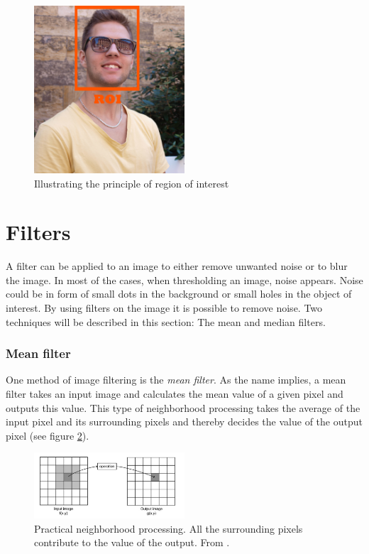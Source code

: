 \begin{figure}[htbp] 
\centering 
\includegraphics[width=0.5\textwidth]{Pictures/Theory/RegionOfInterest.jpg} 
\caption{Illustrating the principle of region of interest} 
\label{fig:Region of Interest} 
\end{figure} 

\section{Filters}
A filter can be applied to an image to either remove unwanted noise or to blur the image. In most of the cases, when thresholding an image, noise appears. Noise could be in form of small dots in the background or small holes in the object of interest. By using filters on the image it is possible to remove noise. Two techniques will be described in this section: The mean and median filters.

\subsubsection{Mean filter}
One method of image filtering is the \textit{mean filter}. As the name implies, a mean filter takes an input image and calculates the mean value of a given pixel and outputs this value. This type of neighborhood processing takes the average of the input pixel and its surrounding pixels and thereby decides the value of the output pixel (see figure \ref{fig:neigh_pros}).

\begin{figure}[htbp] 
\centering 
\includegraphics[width=0.5\textwidth]{Pictures/Theory/neighborhood_processing.png} 
\caption{Practical neighborhood processing. All the surrounding pixels contribute to the value of the output. From \citep{ip_book}.} 
\label{fig:neigh_pros} 
\end{figure}

